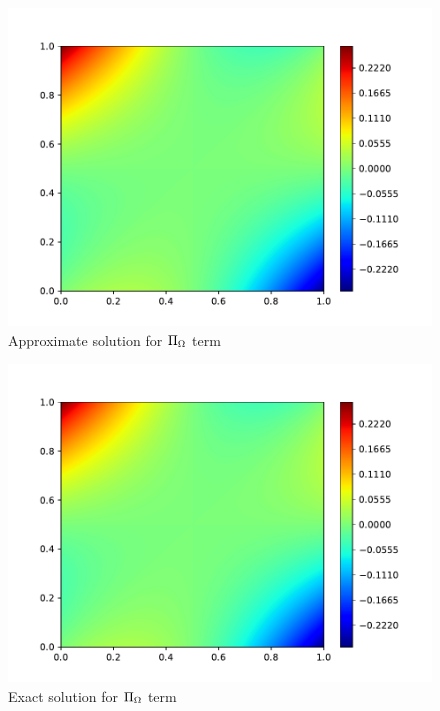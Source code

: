 \begin{figure}[H]
    \includegraphics[height=0.4\textheight]{media/enstrophy-transport-terms/SGS-trans-approx.pdf}
    \caption{Approximate solution for $\Pi_{\Omega}$ term}
    \label{fig:pi-approx}
\end{figure}
\begin{figure}[H]
    \includegraphics[height=0.4\textheight]{media/enstrophy-transport-terms/SGS-trans-exact.pdf}
    \caption{Exact solution for $\Pi_{\Omega}$ term}
    \label{fig:pi-exact}
\end{figure}
